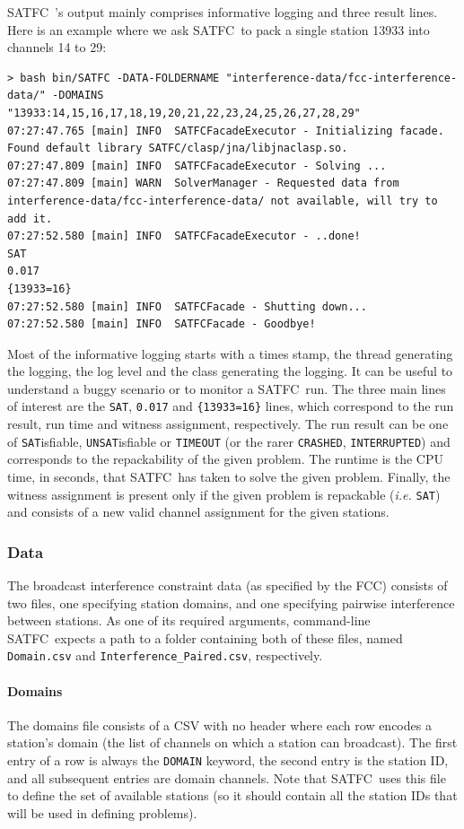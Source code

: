 \documentclass[
10pt, %
letterpaper, %
oneside, %
headinclude,footinclude, %
BCOR5mm, %
needspace, %
]{scrartcl}
\newcommand{\SATFC}{\textsc{SATFC}~}
\begin{document}
\SATFC's output mainly comprises informative logging and three result lines. Here is an example where we ask \SATFC to pack a single station 13933 into channels 14 to 29:
\begin{lstlisting}[style=Bash]
> bash bin/SATFC -DATA-FOLDERNAME "interference-data/fcc-interference-data/" -DOMAINS "13933:14,15,16,17,18,19,20,21,22,23,24,25,26,27,28,29"
07:27:47.765 [main] INFO  SATFCFacadeExecutor - Initializing facade.
Found default library SATFC/clasp/jna/libjnaclasp.so.
07:27:47.809 [main] INFO  SATFCFacadeExecutor - Solving ...
07:27:47.809 [main] WARN  SolverManager - Requested data from interference-data/fcc-interference-data/ not available, will try to add it.
07:27:52.580 [main] INFO  SATFCFacadeExecutor - ..done!
SAT
0.017
{13933=16}
07:27:52.580 [main] INFO  SATFCFacade - Shutting down...
07:27:52.580 [main] INFO  SATFCFacade - Goodbye!
\end{lstlisting}
Most of the informative logging starts with a times stamp, the thread generating the logging, the log level and the class generating the logging. It can be useful to understand a buggy scenario or to monitor a \SATFC run. The three main lines of interest are the \texttt{SAT}, \texttt{0.017} and \texttt{\{13933=16\}} lines, which correspond to the run result, run time and witness assignment, respectively. The run result can be one of \texttt{SAT}isfiable, \texttt{UNSAT}isfiable or \texttt{TIMEOUT} (or the rarer \texttt{CRASHED}, \texttt{INTERRUPTED}) and corresponds to the repackability of the given problem. The runtime is the CPU time, in seconds, that \SATFC has taken to solve the given problem. Finally, the witness assignment is present only if the given problem is repackable (\emph{i.e.} \texttt{SAT}) and consists of a new valid channel assignment for the given stations.


\subsubsection{Data}\label{sec:data}

The broadcast interference constraint data (as specified by the FCC) consists of two files, one specifying station domains, and one specifying pairwise interference between stations. As one of its required arguments, command-line \SATFC expects a path to a folder containing both of these files, named \texttt{Domain.csv} and \texttt{Interference\_Paired.csv}, respectively.

\paragraph{Domains} The domains file consists of a CSV with no header where each row encodes a station's domain (the list of channels on which a station can broadcast). The first entry of a row is always the \texttt{DOMAIN} keyword, the second entry is the station ID, and all subsequent entries are domain channels. Note that \SATFC uses this file to define the set of available stations (so it should contain all the station IDs that will be used in defining problems).
\end{document}
